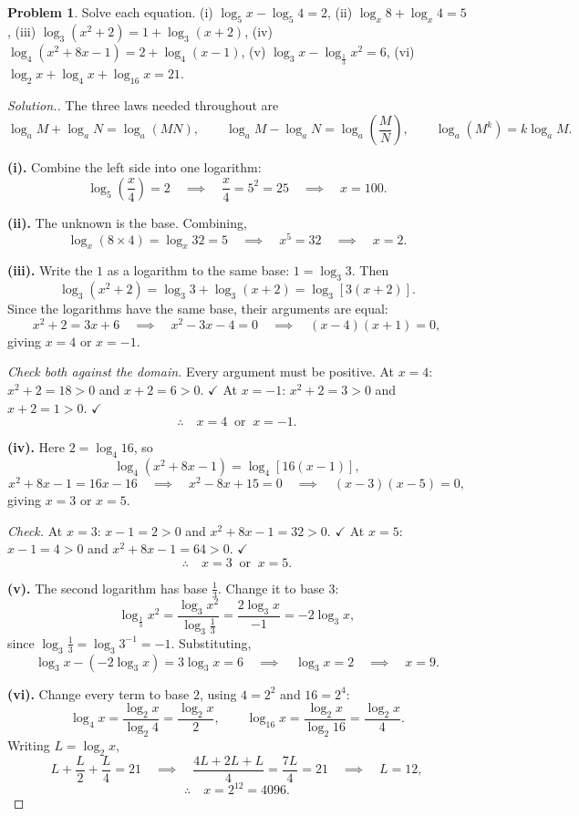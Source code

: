 \documentclass[11pt,a4paper]{article}
\theoremstyle{definition}
\newtheorem{problemx}{Problem}[section]
\newenvironment{problem}{\begin{problemx}}{\end{problemx}}
\newenvironment{solution}
  {\renewcommand{\qedsymbol}{}\begin{proof}[\textit{Solution}.]}
  {\end{proof}}
\let\amscheckmark\checkmark
\renewcommand{\checkmark}{\ensuremath{\amscheckmark}}
\begin{document}
\begin{problem}
Solve each equation.
\quad (i) $\log_5 x-\log_5 4=2$, \quad (ii) $\log_x 8+\log_x 4=5$, \quad
(iii) $\log_3\left(x^2+2\right)=1+\log_3(x+2)$, \quad
(iv) $\log_4\left(x^2+8x-1\right)=2+\log_4(x-1)$, \quad
(v) $\log_3 x-\log_{\frac{1}{3}}x^2=6$, \quad
(vi) $\log_2 x+\log_4 x+\log_{16}x=21$.
\end{problem}

\begin{solution}
The three laws needed throughout are
$$\log_a M+\log_a N=\log_a(MN),\qquad \log_a M-\log_a N=\log_a\!\left(\frac{M}{N}\right),
\qquad \log_a\left(M^k\right)=k\log_a M.$$

\textbf{(i).} Combine the left side into one logarithm:
$$\log_5\left(\frac{x}{4}\right)=2\quad\implies\quad \frac{x}{4}=5^2=25
\quad\implies\quad x=100.$$

\textbf{(ii).} The unknown is the base. Combining,
$$\log_x(8\times 4)=\log_x 32=5\quad\implies\quad x^5=32\quad\implies\quad x=2.$$

\textbf{(iii).} Write the $1$ as a logarithm to the same base: $1=\log_3 3$. Then
$$\log_3\left(x^2+2\right)=\log_3 3+\log_3(x+2)=\log_3\left[3(x+2)\right].$$
Since the logarithms have the same base, their arguments are equal:
$$x^2+2=3x+6\quad\implies\quad x^2-3x-4=0\quad\implies\quad (x-4)(x+1)=0,$$
giving $x=4$ or $x=-1$.

\emph{Check both against the domain.} Every argument must be positive.
At $x=4$: $x^2+2=18>0$ and $x+2=6>0$. $\checkmark$
At $x=-1$: $x^2+2=3>0$ and $x+2=1>0$. $\checkmark$
$$\therefore\quad x=4\ \text{ or }\ x=-1.$$

\textbf{(iv).} Here $2=\log_4 16$, so
$$\log_4\left(x^2+8x-1\right)=\log_4\left[16(x-1)\right],$$
$$x^2+8x-1=16x-16\quad\implies\quad x^2-8x+15=0\quad\implies\quad (x-3)(x-5)=0,$$
giving $x=3$ or $x=5$.

\emph{Check.} At $x=3$: $x-1=2>0$ and $x^2+8x-1=32>0$. $\checkmark$
At $x=5$: $x-1=4>0$ and $x^2+8x-1=64>0$. $\checkmark$
$$\therefore\quad x=3\ \text{ or }\ x=5.$$

\textbf{(v).} The second logarithm has base $\frac{1}{3}$. Change it to base $3$:
$$\log_{\frac{1}{3}}x^2=\frac{\log_3 x^2}{\log_3\frac{1}{3}}=\frac{2\log_3 x}{-1}
=-2\log_3 x,$$
since $\log_3\frac{1}{3}=\log_3 3^{-1}=-1$. Substituting,
$$\log_3 x-\left(-2\log_3 x\right)=3\log_3 x=6\quad\implies\quad \log_3 x=2
\quad\implies\quad x=9.$$

\textbf{(vi).} Change every term to base $2$, using $4=2^2$ and $16=2^4$:
$$\log_4 x=\frac{\log_2 x}{\log_2 4}=\frac{\log_2 x}{2},\qquad
\log_{16}x=\frac{\log_2 x}{\log_2 16}=\frac{\log_2 x}{4}.$$
Writing $L=\log_2 x$,
$$L+\frac{L}{2}+\frac{L}{4}=21\quad\implies\quad \frac{4L+2L+L}{4}=\frac{7L}{4}=21
\quad\implies\quad L=12,$$
$$\therefore\quad x=2^{12}=4096.$$


\end{solution}
\end{document}
